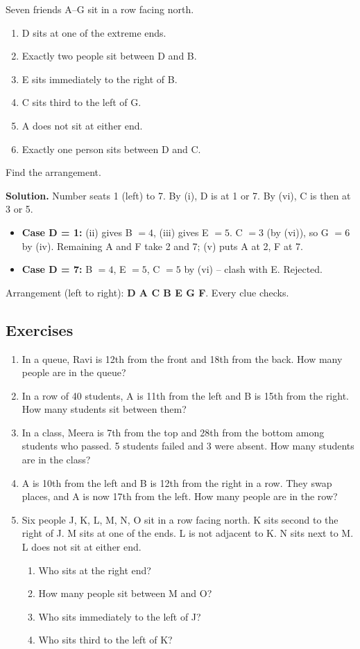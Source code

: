 \documentclass[11pt,a4paper,openany]{report}
\newenvironment{exercises}{\subsection*{Exercises \thechapter}\begin{enumerate}[label=\textbf{\thechapter.\arabic*},leftmargin=3.2em]}{\end{enumerate}}
\begin{document}
\begin{example}
Seven friends A--G sit in a row facing north.
\begin{enumerate}[nosep,label=(\roman*)]
\item D sits at one of the extreme ends.
\item Exactly two people sit between D and B.
\item E sits immediately to the right of B.
\item C sits third to the left of G.
\item A does not sit at either end.
\item Exactly one person sits between D and C.
\end{enumerate}
Find the arrangement.

\textbf{Solution.} Number seats 1 (left) to 7.
By (i), D is at 1 or 7. By (vi), C is then at 3 or 5.
\begin{itemize}[nosep]
\item \textbf{Case D = 1:} (ii) gives B $=4$, (iii) gives E $=5$. C $=3$ (by (vi)), so G $=6$ by (iv). Remaining A and F take 2 and 7; (v) puts A at 2, F at 7.
\item \textbf{Case D = 7:} B $=4$, E $=5$, C $=5$ by (vi) -- clash with E. Rejected.
\end{itemize}
Arrangement (left to right): \textbf{D A C B E G F}. Every clue checks.
\end{example}

\begin{exercises}
\item In a queue, Ravi is 12th from the front and 18th from the back. How many people are in the queue?
\item In a row of 40 students, A is 11th from the left and B is 15th from the right. How many students sit between them?
\item In a class, Meera is 7th from the top and 28th from the bottom among students who passed. 5 students failed and 3 were absent. How many students are in the class?
\item A is 10th from the left and B is 12th from the right in a row. They swap places, and A is now 17th from the left. How many people are in the row?
\item Six people J, K, L, M, N, O sit in a row facing north.
K sits second to the right of J. M sits at one of the ends. L is not adjacent to K. N sits next to M.
L does not sit at either end.
\begin{enumerate}[nosep,label=(\alph*)]
\item Who sits at the right end?
\item How many people sit between M and O?
\item Who sits immediately to the left of J?
\item Who sits third to the left of K?
\end{enumerate}
\end{exercises}
\end{document}
